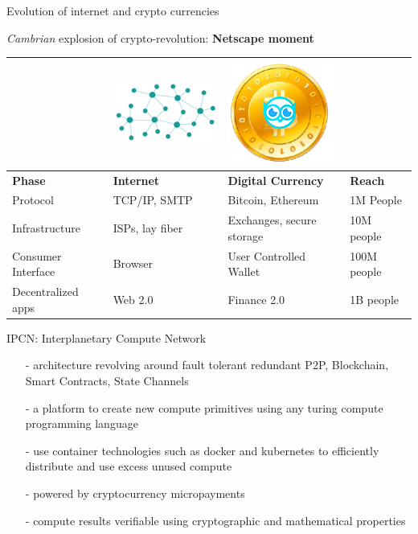 \documentclass[10pt]{beamer}
\begin{document}
\begin{frame}[t]{Evolution of internet and crypto currencies}
    
 \emph{Cambrian} explosion of crypto-revolution: \textbf{Netscape moment}
 
\begin{tabularx} {\textwidth}{|X|X|X|X|}
    \hline
&    \includegraphics[scale=0.3]{static/decentnew} &     \includegraphics[scale=0.3]{static/hootcoin} & \\
    \hline
\textbf{    Phase} & \textbf{Internet} & \textbf{Digital Currency} & \textbf{Reach}\\
\hline
Protocol & TCP/IP, SMTP & Bitcoin, Ethereum & 1M People \\
\hline
Infrastructure & ISPs, lay fiber & Exchanges, secure storage & 10M people \\
\hline
Consumer Interface & Browser  & User Controlled Wallet & 100M people \\
\hline
Decentralized apps &  Web 2.0 & Finance 2.0 & 1B people\\
\hline
\end{tabularx}
\end{frame}    
    
\begin{frame}[t]{IPCN: Interplanetary Compute Network}
    \begin{itemize}
        \item[-]architecture revolving around fault tolerant redundant P2P, Blockchain, Smart Contracts, State Channels
        \item[-]a platform to create new compute primitives using any turing compute programming language
        \item[-]use container technologies such as docker and kubernetes to efficiently distribute and use excess unused compute
        \item[-]powered by cryptocurrency micropayments
        \item[-]compute results verifiable using cryptographic and mathematical properties
    \end{itemize}
\end{frame}
\end{document}
